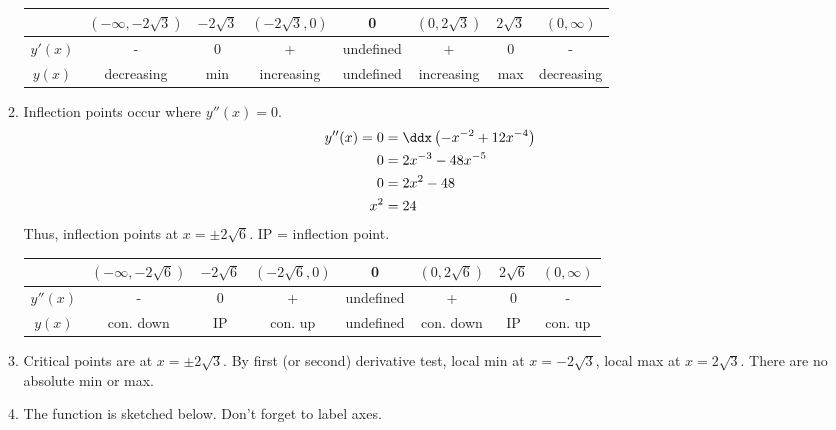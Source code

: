 \begin{enumerate}
\begin{enumerate}
        \begin{center}
			\begin{tabular}{ c c c c c c c c}
              & $(-\infty,-2\sqrt{3})$ & $-2\sqrt{3}$ & $(-2\sqrt{3},0)$ & 0 & $(0,2\sqrt{3})$ & $2\sqrt{3}$ & $(0,\infty)$ \\ 
            \hline \vspace{2pt}
			$y'(x)$ & - & 0 & + & undefined & + & 0 & - \\  
            \vspace{2pt}
 			$y(x)$ & decreasing & min & increasing & undefined & increasing & max & decreasing\\
            \hline
		\end{tabular}
		\end{center}
        \item Inflection points occur where $y''(x) = 0$. 
        \begin{align*}
        	y''(x) =
            0 &= \ddx \left(-x^{-2} + 12x^{-4} \right) \\
            0&= 2x^{-3} - 48x^{-5}\\
            0&=  2x^2 - 48 \\
            x^2 &= 24 
        \end{align*}
        Thus, inflection points at $x = \pm 2\sqrt{6}$. IP = inflection point.
        \begin{center}
			\begin{tabular}{ c c c c c c c c}
              & $(-\infty,-2\sqrt{6})$ & $-2\sqrt{6}$ & $(-2\sqrt{6},0)$ & 0 & $(0,2\sqrt{6})$ & $2\sqrt{6}$ & $(0,\infty)$ \\ 
            \hline \vspace{2pt}
			$y''(x)$ & - & 0 & + & undefined & + & 0 & - \\  
            \vspace{2pt}
 			$y(x)$ & con. down & IP & con. up & undefined & con. down & IP & con. up\\
            \hline
		\end{tabular}
		\end{center}  
        \item Critical points are at $x = \pm 2\sqrt{3}$. By first (or second) derivative test, local min at $x = - 2\sqrt{3}$, local max at $x = 2\sqrt{3}$. There are no absolute min or max. 
        \item The function is sketched below. Don't forget to label axes. 
   

\end{enumerate}
\end{enumerate}
